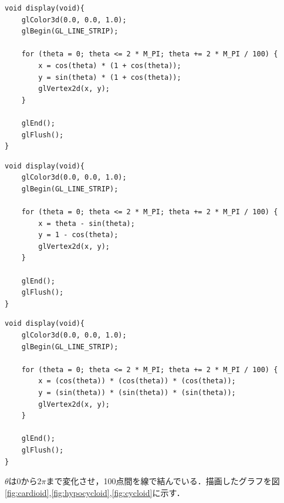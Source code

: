 \documentclass[]{jsarticle}
\begin{document}
\begin{lstlisting}[caption=カージオイドの描画,label=cardioid]
void display(void){
	glColor3d(0.0, 0.0, 1.0);
	glBegin(GL_LINE_STRIP);
	
	for (theta = 0; theta <= 2 * M_PI; theta += 2 * M_PI / 100) {
		x = cos(theta) * (1 + cos(theta));
		y = sin(theta) * (1 + cos(theta));
		glVertex2d(x, y);
	}
	
	glEnd();
	glFlush();
}
\end{lstlisting}

\begin{lstlisting}[caption=サイクロイドの描画,label=cycloid]
void display(void){
	glColor3d(0.0, 0.0, 1.0);
	glBegin(GL_LINE_STRIP);
	
	for (theta = 0; theta <= 2 * M_PI; theta += 2 * M_PI / 100) {
		x = theta - sin(theta);
		y = 1 - cos(theta);
		glVertex2d(x, y);
	}
	
	glEnd();
	glFlush();
}
\end{lstlisting}

\begin{lstlisting}[caption=4尖点の内サイクロイドの描画,label=hypocycloid]
void display(void){
	glColor3d(0.0, 0.0, 1.0);
	glBegin(GL_LINE_STRIP);
	
	for (theta = 0; theta <= 2 * M_PI; theta += 2 * M_PI / 100) {
		x = (cos(theta)) * (cos(theta)) * (cos(theta));
		y = (sin(theta)) * (sin(theta)) * (sin(theta));
		glVertex2d(x, y);
	}
	
	glEnd();
	glFlush();
}
\end{lstlisting}

$\theta$は0から$2\pi$まで変化させ，100点間を線で結んでいる．描画したグラフを図\ref{fig:cardioid},\ref{fig:hypocycloid},\ref{fig:cycloid}に示す．
\end{document}
